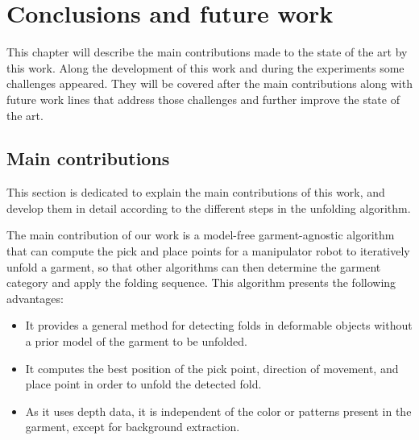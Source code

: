 \chapter{Conclusions and future work}
\label{conclusions_and_future_work}

This chapter will describe the main contributions made to the state of the art by this work. Along the development of this work and during the experiments some challenges appeared. They will be covered after the main contributions along with future work lines that address those challenges and further improve the state of the art.


\section {Main contributions}
\label{conclusions:contributions}

This section is dedicated to explain the main contributions of this work, and develop them in detail according to the different steps in the unfolding algorithm.


The main contribution of our work is a model-free garment-agnostic algorithm that can compute the pick and place points for a manipulator robot to iteratively unfold a garment, so that other algorithms can then determine the garment category and apply the folding sequence. This algorithm presents the following advantages:

\begin{itemize}
	\item It provides a general method for detecting folds in deformable objects without a prior model of the garment to be unfolded.
	\item It computes the best position of the pick point, direction of movement, and place point in order to unfold the detected fold.
	\item As it uses depth data, it is independent of the color or patterns present in the garment, except for background extraction.
\end{itemize}


